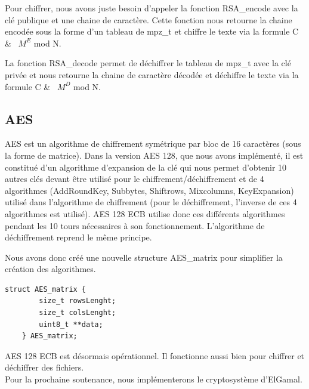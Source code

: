         Pour chiffrer, nous avons juste besoin d’appeler la fonction RSA\_encode avec la clé publique et une chaine de caractère. Cette fonction nous retourne la chaine encodée sous la forme d’un tableau de mpz\_t et chiffre le texte via la formule C &\equiv ~ $M^{E}$ mod N.

        La fonction RSA\_decode permet de déchiffrer le tableau de mpz\_t avec la clé privée et nous retourne la chaine de caractère décodée et déchiffre le texte via la formule C &\equiv ~ $M^{D}$ mod N. \\


	\subsection{AES}
        AES est un algorithme de chiffrement symétrique par bloc de 16 caractères (sous la forme de matrice). Dans la version AES 128, que nous avons implémenté, il est constitué d’un algorithme d’expansion de la clé qui nous permet d’obtenir 10 autres clés devant être utilisé pour le chiffrement/déchiffrement et de 4 algorithmes (AddRoundKey, Subbytes, Shiftrows, Mixcolumns, KeyExpansion) utilisé dans l’algorithme de chiffrement (pour le déchiffrement, l’inverse de ces 4 algorithmes est utilisé).
        AES 128 ECB utilise donc ces différents algorithmes pendant les 10 tours nécessaires à son fonctionnement.
        L’algorithme de déchiffrement reprend le même principe.

        Nous avons donc créé une nouvelle structure AES\_matrix pour simplifier la création des algorithmes.

        \begin{lstlisting}[style=CStyle]
    struct AES_matrix {
        size_t rowsLenght;
        size_t colsLenght;
        uint8_t **data;
    } AES_matrix;
		\end{lstlisting}	

        AES 128 ECB est désormais opérationnel. Il fonctionne aussi bien pour chiffrer et déchiffrer des fichiers. \\

        Pour la prochaine soutenance, nous implémenterons le  cryptosystème d'ElGamal. \\
\newpage

